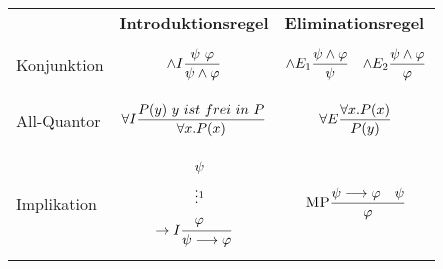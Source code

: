 \documentclass{Zusammenfassung}
\newcommand{\typeRule}[3]{ \textrm{\textsc{#1}}\frac{#2}{#3}}
\begin{document}
\begin{table}[H]
    \centering
    \begin{tabularx}{\textwidth}{lXX}
        & \centerline{\textbf{Introduktionsregel}} &\centerline{\textbf{Eliminationsregel}}\\
        Konjunktion &\begin{equation*}\typeRule{$\wedge{}I$}{\psi\ \varphi}{\psi\wedge \varphi}\end{equation*}&\begin{equation*}\typeRule{$\wedge{}E_1$}{\psi\wedge \varphi}{\psi}\quad\typeRule{$\wedge{}E_2$}{\psi\wedge \varphi}{\varphi}\end{equation*}\\
        All-Quantor &\begin{equation*}\typeRule{$\forall{}I$}{P(y)\ y\ ist\ frei\ in\ P}{\forall{}x.P(x)}\end{equation*}&\begin{equation*}\typeRule{$\forall{}E$}{\forall{}x.P(x)}{P(y)}\end{equation*}\\
        Implikation&\begin{equation*}\typeRule{$\rightarrow{}I$}{\begin{aligned}&\psi&\\&\vdots\footnotemark{}&\\&\varphi&\end{aligned}}{\psi\longrightarrow\varphi}\end{equation*}&\begin{equation*}\typeRule{MP}{\psi\longrightarrow\varphi\quad\psi}{\varphi}\end{equation*}\\
    \end{tabularx}\label{tab:table4}
\end{table}
\end{document}
